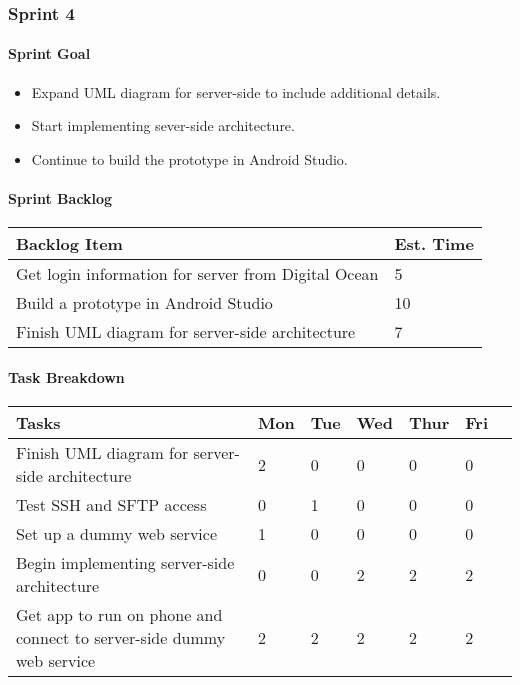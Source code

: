 \subsubsection{Sprint 4}

\paragraph{Sprint Goal}
\begin{itemize}
    \item  Expand UML diagram for server-side to include additional details.
    \item  Start implementing sever-side architecture.
    \item  Continue to build the prototype in Android Studio.
\end{itemize}

\paragraph{Sprint Backlog}
\begin{table}[htbp]
    \centering
    \begin{tabularx}{\textwidth}{l|l}
        Backlog Item & Est. Time\\
        \hline
        Get login information for server from Digital Ocean & 5\\
        Build a prototype in Android Studio & 10\\
        Finish UML diagram for server-side architecture & 7\\
    \end{tabularx}
\end{table}

\paragraph{Task Breakdown}
\begin{tabular}[htbp]
    \centering
    \begin{tabularx}{\textwidth}{l|l|l|l|l|l|l}
        Tasks &    Mon & Tue & Wed & Thur & Fri\\
        \hline
        Finish UML diagram for server-side architecture & 2 & 0 & 0 & 0 & 0\\
        Test SSH and SFTP access & 0 & 1 & 0 & 0 & 0\\
        Set up a dummy web service & 1 & 0 & 0 & 0 & 0\\
        Begin implementing server-side architecture & 0 & 0 & 2 & 2 & 2\\
        Get app to run on phone and connect to server-side dummy web service & 2 & 2 & 2 & 2 & 2\\
    \end{tabularx}
\end{tabular}

